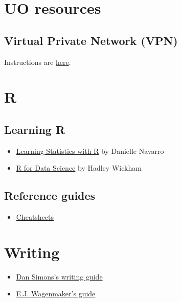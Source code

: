 \documentclass[]{book}
\providecommand{\tightlist}{%
  \setlength{\itemsep}{0pt}\setlength{\parskip}{0pt}}
\begin{document}
\hypertarget{uo-resources}{%
\section{UO resources}\label{uo-resources}}

\hypertarget{virtual-private-network-vpn}{%
\subsection{Virtual Private Network (VPN)}\label{virtual-private-network-vpn}}

Instructions are \href{https://casit.uoregon.edu/faq/distance-work/cisco-vpn}{here}.

\hypertarget{r}{%
\section{R}\label{r}}

\hypertarget{learning-r}{%
\subsection{Learning R}\label{learning-r}}

\begin{itemize}
\tightlist
\item
  \href{http://learningstatisticswithr-bookdown.netlify.com}{Learning Statistics with R} by Danielle Navarro
\item
  \href{http://r4ds.had.co.nz}{R for Data Science} by Hadley Wickham
\end{itemize}

\hypertarget{reference-guides}{%
\subsection{Reference guides}\label{reference-guides}}

\begin{itemize}
\tightlist
\item
  \href{https://www.rstudio.com/resources/cheatsheets/}{Cheatsheets}
\end{itemize}

\hypertarget{writing}{%
\section{Writing}\label{writing}}

\begin{itemize}
\tightlist
\item
  \href{http://www.dansimons.com/resources/writing_tips.html}{Dan Simons's writing guide}
\item
  \href{http://www.ejwagenmakers.com/2009/TeachingTipsWriting.pdf}{E.J. Wagenmaker's guide}
\end{itemize}
\end{document}
